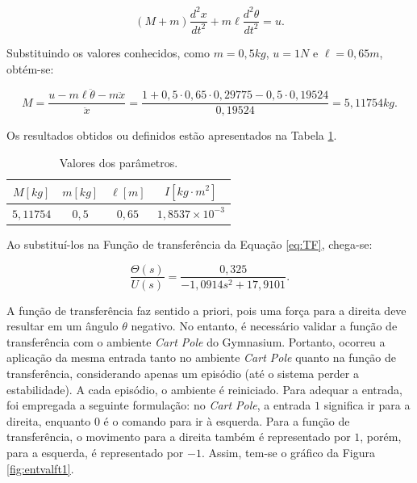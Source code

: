 \documentclass[12pt,           %
a4paper,                       %
openany,                       %
oneside,                       %
chapter=TITLE,                 %
english,                       %
spanish,                       %
brazil,                        %
sumario=tradicional]{abntex2}  %
\begin{document}
\begin{OnehalfSpace}
\begin{equation}
    (M + m)\frac{d^2 x}{dt^2} + m\ell \frac{d^2 \theta}{dt^2} = u.
    \label{eq:M}
\end{equation}

Substituindo os valores conhecidos, como $m = 0,5kg$, $u = 1N$ e $\ell = 0,65m$, obtém-se:

\begin{equation}
    M = \frac{u - m\ell\ddot{\theta}-m\ddot{x}}{\ddot{x}} = \frac{1 + 0,5\cdot 0,65\cdot 0,29775 - 0,5\cdot 0,19524}{0,19524} = 5,11754 kg.
    \label{eq:Mn}
\end{equation}


Os resultados obtidos ou definidos estão apresentados na Tabela \ref{tab:paramct}.


\begin{table}[H]
	\centering
	\vspace*{-0.2cm}
	\caption{Valores dos parâmetros.}
    \begin{tabular}{|c|c|c|c|}
    		\hline
            $M [kg]$ & $m [kg]$ & $\ell [m]$ & $I[kg\cdot m^2]$\\
            \hline
            $5,11754$ & $0,5$ & $0,65$ & $1,8537\times 10^{-3}$ \\
            \hline
        \end{tabular}
        \label{tab:paramct}                 %
 \end{table}
\vspace*{-0.675cm}
{\raggedright {}}

Ao substituí-los na Função de transferência da Equação \ref{eq:TF}, chega-se:

\begin{equation}
     \frac{\Theta (s)}{U(s)} = \frac{0,325}{-1,0914s^2 + 17,9101}.
    \label{eq:FT1}
\end{equation}

A função de transferência faz sentido a priori, pois uma força para a direita deve resultar em um ângulo $\theta$ negativo. No entanto, é necessário validar a função de transferência com o ambiente \textit{Cart Pole} do Gymnasium. Portanto, ocorreu a aplicação da mesma entrada tanto no ambiente \textit{Cart Pole} quanto na função de transferência, considerando apenas um episódio (até o sistema perder a estabilidade). A cada episódio, o ambiente é reiniciado. Para adequar a entrada, foi empregada a seguinte formulação: no \textit{Cart Pole}, a entrada $1$ significa ir para a direita, enquanto $0$ é o comando para ir à esquerda. Para a função de transferência, o movimento para a direita também é representado por $1$, porém, para a esquerda, é representado por $-1$. Assim, tem-se o gráfico da Figura \ref{fig:entvalft1}.


\end{OnehalfSpace}
\end{document}
